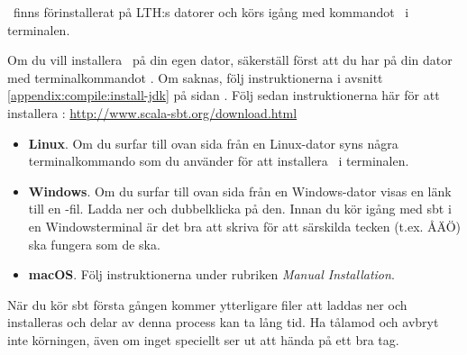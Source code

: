 \sbt\ finns förinstallerat på LTH:s datorer och körs igång med kommandot \sbt\ i terminalen.

Om du vill installera \sbt\ på din egen dator,
säkerställ först att du har  på din dator med terminalkommandot . Om  saknas, följ instruktionerna i avsnitt \ref{appendix:compile:install-jdk} på sidan \pageref{appendix:compile:install-jdk}.
Följ sedan instruktionerna här för att installera \sbt: \url{http://www.scala-sbt.org/download.html}

\begin{itemize}

\item \textbf{Linux}. Om du surfar till ovan sida från en Linux-dator syns några terminalkommando som du använder för att installera \sbt\ i terminalen.

\item \textbf{Windows}. Om du surfar till ovan sida från en Windows-dator visas en länk till en -fil. Ladda ner och dubbelklicka på den. Innan du kör igång med sbt i en Windowsterminal är det bra att skriva  för att särskilda tecken (t.ex. ÅÄÖ) ska fungera som de ska.

\item \textbf{macOS}. Följ instruktionerna under rubriken \textit{Manual Installation}.

\end{itemize}

\noindent När du kör sbt första gången kommer ytterligare filer att laddas ner och installeras och delar av denna process kan ta lång tid. Ha tålamod och avbryt inte körningen, även om inget speciellt ser ut att hända på ett bra tag.

%
%


